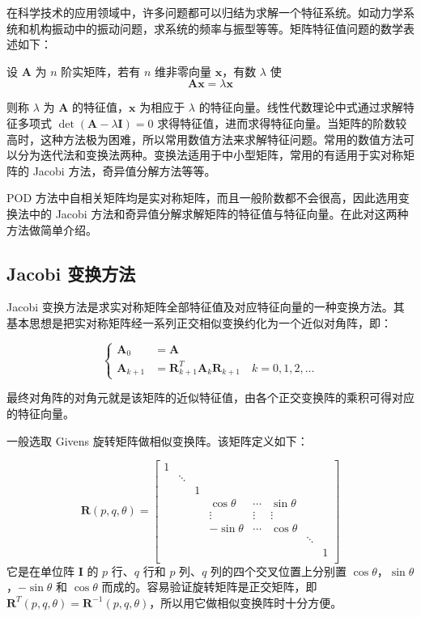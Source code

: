 在科学技术的应用领域中，许多问题都可以归结为求解一个特征系统。如动力学系统和机构振动中的振动问题，求系统的频率与振型等等。矩阵特征值问题的数学表述如下：

设 \(\mathbf{A}\) 为 \(n\) 阶实矩阵，若有 \(n\) 维非零向量 \(\mathbf{x}\)，有数 \(\lambda\) 使\begin{equation}
\mathbf{A}\mathbf{x} = \lambda \mathbf{x} 
\end{equation}

则称 \(\lambda\) 为 \(\mathbf{A}\) 的特征值，\(\mathbf{x}\) 为相应于 \(\lambda\) 的特征向量。线性代数理论中式通过求解特征多项式 \(\det(\mathbf{A} - \lambda \mathbf{I}) = 0\) 求得特征值，进而求得特征向量。当矩阵的阶数较高时，这种方法极为困难，所以常用数值方法来求解特征问题。常用的数值方法可以分为迭代法和变换法两种。变换法适用于中小型矩阵，常用的有适用于实对称矩阵的 Jacobi 方法，奇异值分解方法等等。

POD 方法中自相关矩阵均是实对称矩阵，而且一般阶数都不会很高，因此选用变换法中的 Jacobi 方法和奇异值分解求解矩阵的特征值与特征向量。在此对这两种方法做简单介绍。

\subsection{Jacobi 变换方法}

Jacobi 变换方法是求实对称矩阵全部特征值及对应特征向量的一种变换方法。其基本思想是把实对称矩阵经一系列正交相似变换约化为一个近似对角阵，即：

\begin{equation}
\left\{
\begin{aligned}
\mathbf{A}_0 &= \mathbf{A} \\
\mathbf{A}_{k+1} &= \mathbf{R}_{k+1}^T \mathbf{A}_k \mathbf{R}_{k+1} \quad k = 0, 1, 2, \ldots
\end{aligned}
\right. 
\end{equation}

最终对角阵的对角元就是该矩阵的近似特征值，由各个正交变换阵的乘积可得对应的特征向量。

一般选取 Givens 旋转矩阵做相似变换阵。该矩阵定义如下：


\begin{equation}
\mathbf{R}(p,q,\theta)=\begin{bmatrix} 1 & & & & & & & \\ & \ddots & & & & & & \\ & & 1 & & & & & \\ & & & \cos\theta & \cdots & \sin\theta & & \\ & & & \vdots & \vdots & \vdots & & \\ & & & -\sin\theta & \cdots & \cos\theta & & \\ & & & & & & \ddots & \\ & & & & & & & 1 \\\end{bmatrix} 
\end{equation}
它是在单位阵 \(\mathbf{I}\) 的 \(p\) 行、\(q\) 行和 \(p\) 列、\(q\) 列的四个交叉位置上分别置 \(\cos\theta\)，\(\sin\theta\)，\(-\sin\theta\) 和 \(\cos\theta\) 而成的。容易验证旋转矩阵是正交矩阵，即 \(\mathbf{R}^T(p, q, \theta) = \mathbf{R}^{-1}(p, q, \theta)\)，所以用它做相似变换阵时十分方便。


